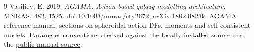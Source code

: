 \documentclass[11pt,a4paper]{article}
\begin{document}
\begin{thebibliography}{9}
Vasiliev, E. 2019, \emph{AGAMA: Action-based galaxy modelling architecture},
MNRAS, 482, 1525.
\href{https://doi.org/10.1093/mnras/sty2672}{doi:10.1093/mnras/sty2672};
\href{https://arxiv.org/abs/1802.08239}{arXiv:1802.08239}.
AGAMA reference manual, sections on spheroidal action DFs, moments and
self-consistent models. Parameter conventions checked against the locally
installed source and the
\href{https://github.com/GalacticDynamics-Oxford/Agama/blob/master/doc/reference.tex}{public manual source}.
\end{thebibliography}
\end{document}
